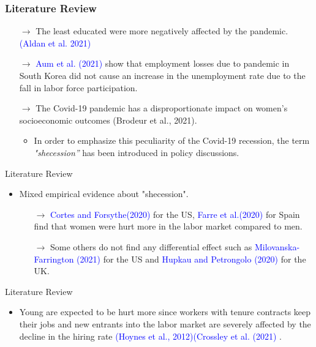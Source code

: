 \documentclass[
	11pt, %
]{beamer}
\begin{document}
\begin{frame}

    \frametitle{Literature Review}
    \begin{itemize}
        \item[$\rightarrow$]The least educated were more negatively affected by the pandemic. \textcolor{blue}{(Aldan et al. 2021)}
        \item[$\rightarrow$] \textcolor{blue}{Aum et al. (2021)} show that employment losses due to pandemic in South Korea did not cause an increase in the unemployment rate due to the fall in labor force participation.
        \item[$\rightarrow$] The Covid-19 pandemic has a disproportionate impact on women's socioeconomic outcomes (Brodeur et al., 2021). 
        \begin{itemize}
            \item In order to emphasize this peculiarity of the Covid-19 recession, the term \textit{"shecession”} has been introduced in policy discussions.
        \end{itemize}
        
        
    \end{itemize}
    
    
\end{frame}
\begin{frame}{Literature Review}
\begin{itemize}
    \item Mixed empirical evidence about "shecession".
    \begin{itemize}
        \item[$\rightarrow$] \textcolor{blue}{Cortes and Forsythe(2020)} for the US, \textcolor{blue}{Farre et al.(2020)} for Spain find that women were hurt more in the labor market compared to men. 
        \item[$\rightarrow$] Some others do not find any differential effect such as \textcolor{blue}{Milovanska-Farrington (2021)}  for the US and \textcolor{blue}{Hupkau and Petrongolo (2020)} for the UK. 
    \end{itemize}
\end{itemize}

\end{frame}


\begin{frame}{Literature Review}
     \begin{itemize}
         \item Young are expected to be hurt more since workers with tenure contracts keep their jobs and new entrants into the labor market are severely affected by the decline in the hiring rate \textcolor{blue}{(Hoynes et al., 2012)(Crossley et al. (2021)} .
     \end{itemize}

\end{frame}
\end{document}
